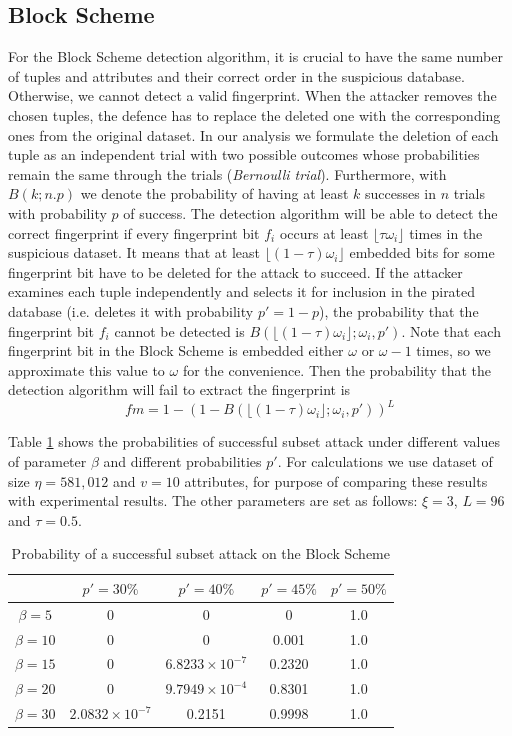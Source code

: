 \subsection{Block Scheme}
For the Block Scheme detection algorithm, it is crucial to have the same number of tuples and attributes and their correct order in the suspicious database. Otherwise, we cannot detect a valid fingerprint. 
When the attacker removes the chosen tuples, the defence has to replace the deleted one with the corresponding ones from the original dataset. 
In our analysis we formulate the deletion of each tuple as an independent trial with two possible outcomes whose probabilities remain the same through the trials (\textit{Bernoulli trial}). Furthermore, with $B(k;n.p)$ we denote the probability of having at least $k$ successes in $n$ trials with probability $p$ of success.  
The detection algorithm will be able to detect the correct fingerprint if every fingerprint bit $f_i$ occurs at least $\lfloor\tau\omega_i\rfloor$ times in the suspicious dataset.
It means that at least $\lfloor(1-\tau)\omega_i\rfloor$ embedded bits for some fingerprint bit have to be deleted for the attack to succeed.  
If the attacker examines each tuple independently and selects it for inclusion in the pirated database (i.e. deletes it with probability $p'=1-p$), the probability that the fingerprint bit $f_i$ cannot be detected is $B(\lfloor(1-\tau)\omega_i\rfloor;\omega_i,p')$.
Note that each fingerprint bit in the Block Scheme is embedded either $\omega$ or $\omega-1$ times, so we approximate this value to $\omega$ for the convenience.
Then the probability that the detection algorithm will fail to extract the fingerprint is 
\begin{equation}
    fm=1-(1-B(\lfloor(1-\tau)\omega_i\rfloor;\omega_i,p'))^L
\end{equation}

Table \ref{table:subset-attack-block} shows the probabilities of successful subset attack under different values of parameter $\beta$ and different probabilities $p'$. For calculations we use dataset of size $\eta = 581,012$ and $v=10$ attributes, for purpose of comparing these results with experimental results.
The other parameters are set as follows: $\xi=3$, $L=96$ and $\tau=0.5$.

\begin{table}[ht]
\centering
\caption{Probability of a successful subset attack on the Block Scheme}
\label{table:subset-attack-block}
\begin{tabular}{|c|c|c|c|c|} 
 \hline
 & \textbf{$p'=30\%$} & \textbf{$p'=40\%$} & \textbf{$p'=45\%$} & \textbf{$p'=50\%$}\\
 \hline
 $\beta=5$ & 0 & 0 & 0 & 1.0 \\
 \hline
 $\beta=10$ & 0 & 0 & 0.001 & 1.0 \\
 \hline
 $\beta=15$ & 0 & $6.8233\times10^{-7}$ & 0.2320 & 1.0 \\
 \hline
 $\beta=20$ & 0 & $9.7949\times10^{-4}$ & 0.8301 & 1.0\\
 \hline
  $\beta=30$ & $2.0832\times10^{-7}$ & 0.2151 & 0.9998 & 1.0 \\
 \hline
\end{tabular}
\end{table}

